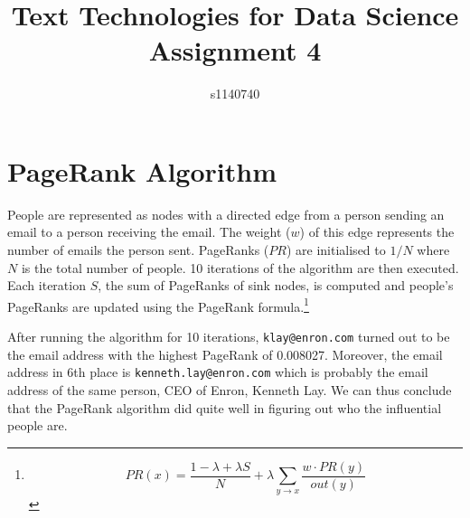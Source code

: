 \documentclass{tufte-handout}
\title{Text Technologies for Data Science Assignment 4}
\author{s1140740}
\begin{document}
\maketitle

\bigskip


\section{PageRank Algorithm}\label{pagerank-algorithm}

People are represented as nodes with a directed edge from a person
sending an email to a person receiving the email. The weight ($w$) of
this edge represents the number of emails the person sent. PageRanks
($PR$) are initialised to $1/N$ where $N$ is the total number of people.
10 iterations of the algorithm are then executed. Each iteration $S$,
the sum of PageRanks of sink nodes, is computed and people's PageRanks
are updated using the PageRank formula.\footnote{\[PR(x) = \frac{1-\lambda+\lambda S}{N} + \lambda \sum_{y \rightarrow x} \frac{w \cdot PR(y)}{out(y)} \]}

After running the algorithm for 10 iterations, \texttt{klay@enron.com}
turned out to be the email address with the highest PageRank of
0.008027. Moreover, the email address in 6th place is
\texttt{kenneth.lay@enron.com} which is probably the email address of
the same person, CEO of Enron, Kenneth Lay. We can thus conclude that
the PageRank algorithm did quite well in figuring out who the
influential people are.
\end{document}

